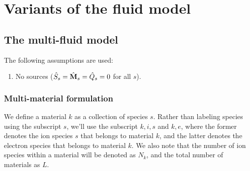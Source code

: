 \documentclass[a4paper,11pt]{report}
\begin{document}
\chapter{Variants of the fluid model}

\section{The multi-fluid model}
The following assumptions are used:
\begin{enumerate}
    \item No sources ($\hat{S}_s = \hat{\mathbf{M}}_s = \hat{Q}_s = 0$ for all $s$).
\end{enumerate}

\subsection{Multi-material formulation}
We define a material $k$ as a collection of species $s$. Rather than labeling species using the subscript $s$, we'll use the subscript $k,i,s$ and $k,e$, where the former denotes the ion species $s$ that belongs to material $k$, and the latter denotes the electron species that belongs to material $k$. We also note that the number of ion species within a material will be denoted as $N_k$, and the total number of materials as $L$.
\end{document}
